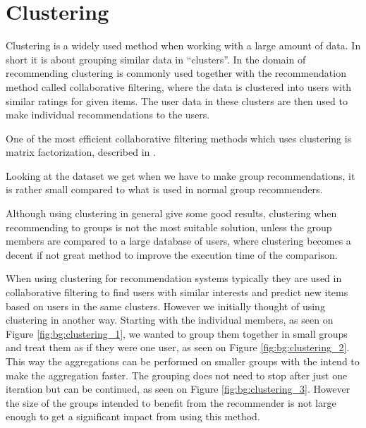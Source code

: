 \section{Clustering}\label{bg:clustering}
Clustering is a widely used method when working with a large amount of data. In short it is about grouping similar data in ``clusters''. In the domain of recommending clustering is commonly used together with the recommendation method called collaborative filtering, where the data is clustered into users with similar ratings for given items. The user data in these clusters are then used to make individual recommendations to the users.

One of the most efficient collaborative filtering methods which uses clustering is matrix factorization, described in . 

Looking at the dataset we get when we have to make group recommendations, it is rather small compared to what is used in normal group recommenders.

Although using clustering in general give some good results, clustering when recommending to groups is not the most suitable solution, unless the group members are compared to a large database of users, where clustering becomes a decent if not great method to improve the execution time of the comparison.

When using clustering for recommendation systems typically they are used in collaborative filtering to find users with similar interests and predict new items based on users in the same clusters. However we initially thought of using clustering in another way. Starting with the individual members, as seen on Figure \ref{fig:bg:clustering_1}, we wanted to group them together in small groups and treat them as if they were one user, as seen on Figure \ref{fig:bg:clustering_2}. This way the aggregations can be performed on smaller groups with the intend to make the aggregation faster. The grouping does not need to stop after just one iteration but can be continued, as seen on Figure \ref{fig:bg:clustering_3}. However the size of the groups intended to benefit from the recommender is not large enough to get a significant impact from using this method. 


